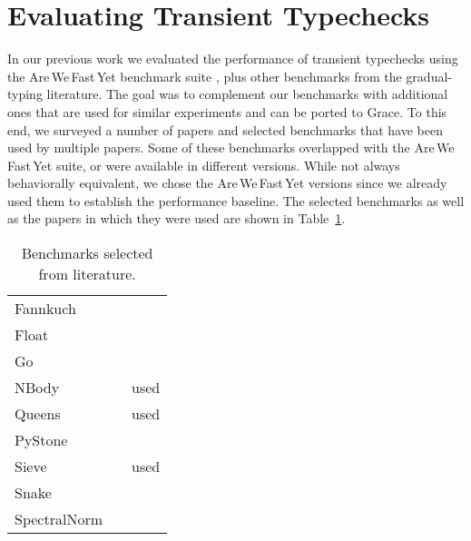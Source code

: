 \documentclass[sigplan,10pt,review,screen]{acmart}\settopmatter{printfolios=true}
\def\AWFY{Are\,We\,Fast\,Yet\xspace}
\begin{document}
\section{Evaluating Transient Typechecks}
\label{s-eval}

In our previous work \cite{roberts-and-co-ecoop-2019} we evaluated the
performance of transient typechecks using the \AWFY
benchmark suite \cite{Marr2016}, plus other
benchmarks from the gradual-typing literature.
The goal was to complement our benchmarks with additional ones that are
used for similar experiments and can be ported to Grace.
To this end, we surveyed a number of papers
\citep{Takikawa2016,Vitousek2017,Muehlboeck2017,Bauman2017,Richards2017,Stulova2016,Greenman2018}
and selected benchmarks that have been used by multiple papers.
Some of these benchmarks overlapped with the \AWFY suite,
or were available in different versions.
While not always behaviorally equivalent,
we chose the \AWFY versions since we already used them to
establish the performance baseline.
The selected benchmarks as well as the papers in which they were used are shown in
Table~\ref{tab:gradual-benchmarks}.

\begin{table}[htb]
  \caption{Benchmarks selected from literature.}
  \label{tab:gradual-benchmarks}
  \begin{center}
    \begin{tabular}{l l r}
      Fannkuch & \cite{Vitousek2017,Greenman2018} \\
      Float & \cite{Vitousek2017,Muehlboeck2017,Greenman2018} \\
      Go & \cite{Vitousek2017,Muehlboeck2017,Greenman2018} \\
      NBody & \cite{Kuhlenschmidt:2018:preprint,Vitousek2017,Greenman2018} & used \cite{Marr2016} \\
      Queens & \cite{Vitousek2017,Muehlboeck2017,Greenman2018} & used \cite{Marr2016} \\
      PyStone & \cite{Vitousek2017,Muehlboeck2017,Greenman2018} \\
      Sieve & \cite{Takikawa2016,Muehlboeck2017,Bauman2017,Richards2017,Greenman2019jfp} & used \cite{Marr2016} \\
      Snake & \cite{Takikawa2016,Muehlboeck2017,Bauman2017,Richards2017,Greenman2019jfp} \\
      SpectralNorm & \cite{Vitousek2017,Muehlboeck2017,Greenman2018} \\
    \end{tabular}
  \end{center}
\end{table}
\end{document}
